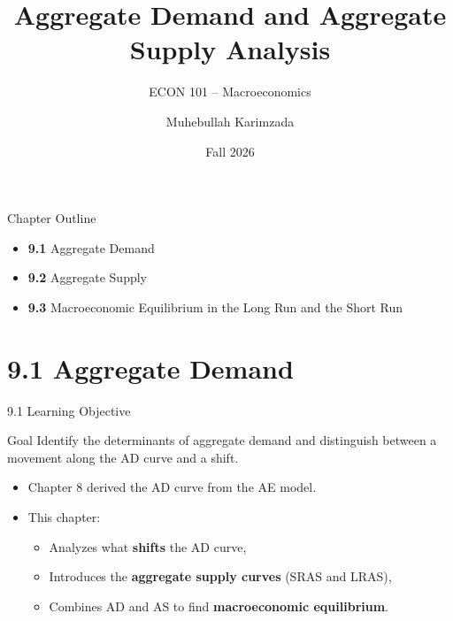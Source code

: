\documentclass[aspectratio=169]{beamer}
\title{\textbf{Aggregate Demand and Aggregate Supply Analysis}}
\subtitle{{\large ECON 101 -- Macroeconomics}}
\author{Muhebullah Karimzada}
\date{Fall 2026}
\begin{document}

\begin{frame}[plain]
  \titlepage
\end{frame}

\begin{frame}{Chapter Outline}
\transfade
\begin{itemize}
  \item \textbf{9.1} Aggregate Demand
  \item \textbf{9.2} Aggregate Supply
  \item \textbf{9.3} Macroeconomic Equilibrium in the Long Run and the Short Run
\end{itemize}
\end{frame}

\section{9.1 Aggregate Demand}

\begin{frame}{9.1 Learning Objective}
\transfade
\begin{block}{Goal}
Identify the determinants of aggregate demand and distinguish between a movement along the AD curve and a shift.
\end{block}
\begin{itemize}
  \item Chapter 8 derived the AD curve from the AE model.
  \item This chapter:
  \begin{itemize}
    \item Analyzes what \textbf{shifts} the AD curve,
    \item Introduces the \textbf{aggregate supply curves} (SRAS and LRAS),
    \item Combines AD and AS to find \textbf{macroeconomic equilibrium}.
  \end{itemize}
\end{itemize}
\end{frame}
\end{document}
